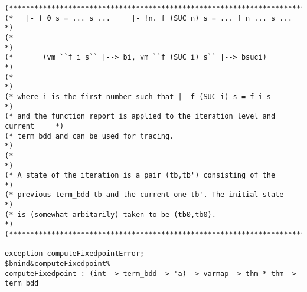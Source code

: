 \documentclass[12pt]{article}
\begin{document}
\begin{footnotesize}
\begin{Verbatim}[commandchars=\$\&\%]
(*****************************************************************************)
(*   |- f 0 s = ... s ...     |- !n. f (SUC n) s = ... f n ... s ...         *)
(*   ---------------------------------------------------------------         *)
(*       (vm ``f i s`` |--> bi, vm ``f (SUC i) s`` |--> bsuci)               *)
(*                                                                           *)
(* where i is the first number such that |- f (SUC i) s = f i s              *)
(* and the function report is applied to the iteration level and current     *)
(* term_bdd and can be used for tracing.                                     *)
(*                                                                           *)
(* A state of the iteration is a pair (tb,tb') consisting of the             *)
(* previous term_bdd tb and the current one tb'. The initial state           *)
(* is (somewhat arbitarily) taken to be (tb0,tb0).                           *)
(*****************************************************************************)

exception computeFixedpointError;
$bnind&computeFixedpoint%
computeFixedpoint : (int -> term_bdd -> 'a) -> varmap -> thm * thm -> term_bdd














\end{Verbatim}
\end{footnotesize}
\end{document}
